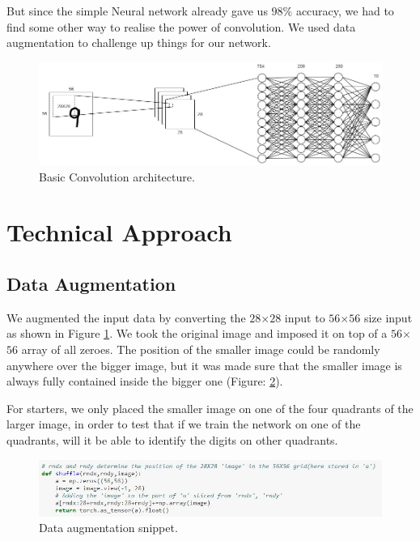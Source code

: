 \documentclass[12pt]{acmart}
\begin{document}
But since the simple Neural network already gave us $98\%$ accuracy, we had to find some other way to realise the power of convolution. We used data augmentation to challenge up things for our network.

\begin{figure}[H]
  \includegraphics[width=\linewidth]{Convolution.jpg}
  \caption{Basic Convolution architecture.}
  \label{fig:Convolution}
\end{figure}


\section{Technical Approach}
\subsection{Data Augmentation}
We augmented the input data by converting the $28$$\times$$28$ input to $56$$\times$$56$ size input as shown in Figure \ref{fig:Convolution}. We took the original image and imposed it on top of a $56$$\times$$56$ array of all zeroes. The position of the smaller image could be randomly anywhere over the bigger image, but it was made sure that the smaller image is always fully contained inside the bigger one (Figure: \ref{fig:Shuffle}).

For starters, we only placed the smaller image on one of the four quadrants of the larger image, in order to test that if we train the network on one of the quadrants, will it be able to identify the digits on other quadrants.

\begin{figure}[H]
  \includegraphics[width=\linewidth]{Shuffle.JPG}
  \caption{Data augmentation snippet.}
  \label{fig:Shuffle}
\end{figure}
\end{document}
